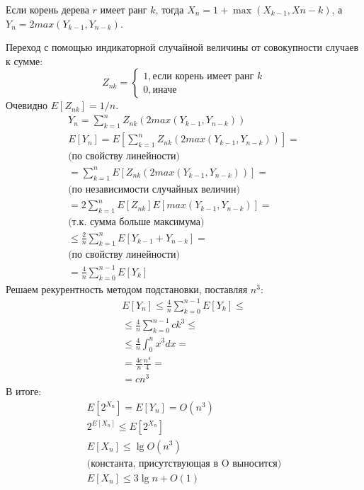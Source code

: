 Если корень дерева $r$ имеет ранг $k$, тогда $X_n = 1 + \max(X_{k-1}, X{n-k})$, а $Y_n = 2max(Y_{k-1}, Y_{n-k})$.

Переход с помощью индикаторной случайной величины от совокупности случаев к сумме:
\begin{equation*}
  Z_{nk} = \begin{cases}
      1, \text{если корень имеет ранг } k\\
      0, \text{иначе}
  \end{cases}
\end{equation*}
Очевидно $E[Z_{nk}] = 1 / n$.
\begin{align*}
  Y_n = \sum_{k=1}^{n} Z_{nk} (2max(Y_{k-1}, Y_{n-k})) \\
  E[Y_n] = E[\sum_{k=1}^{n} Z_{nk} (2max(Y_{k-1}, Y_{n-k})) ] = \\
  \text{(по свойству линейности)} \\
  = \sum_{k=1}^{n} E[Z_{nk} (2max(Y_{k-1}, Y_{n-k}))] = \\
  \text{(по независимости случайных величин)} \\
  = 2 \sum_{k=1}^{n} E[Z_{nk}] E[max(Y_{k-1}, Y_{n-k})] = \\
  \text{(т.к. сумма больше максимума)} \\
  \leqslant \frac{2}{n} \sum_{k=1}^{n} E[Y_{k-1} + Y_{n-k}] = \\
  \text{(по свойству линейности)} \\
  = \frac{4}{n}\sum_{k=0}^{n-1}E[Y_k]
\end{align*}
Решаем рекурентность методом подстановки, поставляя $n^3$:
\begin{align*}
  E[Y_n] \leqslant \frac{4}{n}\sum_{k=0}^{n-1}E[Y_k] \leqslant \\
  \leqslant \frac{4}{n}\sum_{k=0}^{n-1}c k^3 \leqslant \\
  \leqslant \frac{4}{n}\int_{0}^{n}x^3 dx = \\
  = \frac{4c}{n} \frac{n^4}{4} = \\
  = c n^3
\end{align*}
В итоге:
\begin{align*}
  E[2^{X_n}] = E[Y_n] = O(n^3) \\
  2^{E[X_n]} \leqslant E[2^{X_n}] \\
  E[X_n] \leqslant \lg O(n^3) \\
  \text{(константа, присутствующая в O выносится)} \\
  E[X_n] \leqslant 3 \lg n + O(1) \\
\end{align*}

